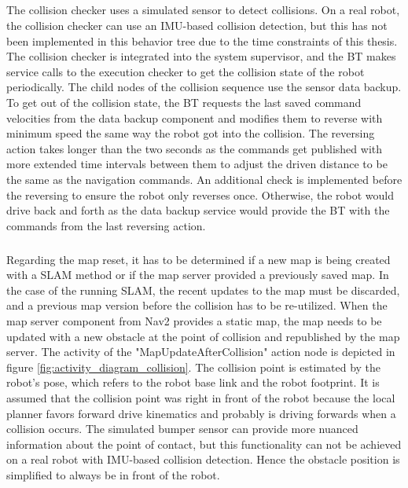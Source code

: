 \subparagraph*{}
The collision checker uses a simulated sensor to detect collisions. On a real robot, the collision checker can use an IMU-based collision detection, but this has not been implemented in this behavior tree due to the time constraints of this thesis. The collision checker is integrated into the system supervisor, and the BT makes service calls to the execution checker to get the collision state of the robot periodically. 
The child nodes of the collision sequence use the sensor data backup. 
To get out of the collision state, the BT requests the last saved command velocities from the data backup component and modifies them to reverse with minimum speed the same way the robot got into the collision. The reversing action takes longer than the two seconds as the commands get published with more extended time intervals between them to adjust the driven distance to be the same as the navigation commands. An additional check is implemented before the reversing to ensure the robot only reverses once. Otherwise, the robot would drive back and forth as the data backup service would provide the BT with the commands from the last reversing action. 

%
\subparagraph*{}
Regarding the map reset, it has to be determined if a new map is being created with a SLAM method or if the map server provided a previously saved map. In the case of the running SLAM, the recent updates to the map must be discarded, and a previous map version before the collision has to be re-utilized. When the map server component from Nav2 provides a static map, the map needs to be updated with a new obstacle at the point of collision and republished by the map server. 
The activity of the "MapUpdateAfterCollision" action node is depicted in figure \ref{fig:activity_diagram_collision}. The collision point is estimated by the robot's pose, which refers to the robot base link and the robot footprint. It is assumed that the collision point was right in front of the robot because the local planner favors forward drive kinematics and probably is driving forwards when a collision occurs. The simulated bumper sensor can provide more nuanced information about the point of contact, but this functionality can not be achieved on a real robot with IMU-based collision detection. Hence the obstacle position is simplified to always be in front of the robot. 
%

